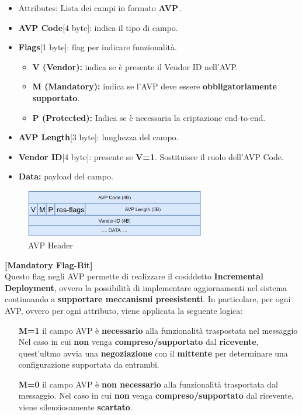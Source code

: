 \begin{itemize}
    \item Attributes: Lista dei campi in formato \textbf{AVP}\footnotemark\,.
\end{itemize}
\begin{definition}
\begin{itemize}
    \item \textbf{AVP Code}[4 byte]: indica il tipo di campo.
    \item \textbf{Flags}[1 byte]: flag per indicare funzionalità.
    \begin{itemize}
        \item \textbf{V (Vendor):} indica se è presente il Vendor ID nell'AVP.
        \item \textbf{M (Mandatory):} indica se l'AVP deve essere \textbf{obbligatoriamente supportato}.
        \item \textbf{P (Protected):} Indica se è necessaria la criptazione end-to-end.
    \end{itemize}
    \item \textbf{AVP Length}[3 byte]: lunghezza del campo.
    \item \textbf{Vendor ID}[4 byte]: presente se \textbf{V=1}. Sostituisce il ruolo dell'AVP Code.
    \item \textbf{Data:} payload del campo.
\end{itemize}
\end{definition}
\begin{figure}[ht]
    \centering
    \includegraphics[width=0.7\textwidth]{image/avpheader.png}
    \caption{AVP Header}
    \label{fig:avpheader}
\end{figure}\pagebreak
\begin{note}\textbf{[Mandatory Flag-Bit]}\\
Questo flag negli AVP permette di realizzare il cosiddetto \textbf{Incremental Deployment}, ovvero la possibilità di implementare aggiornamenti nel sistema continuando a \textbf{supportare meccanismi preesistenti}. In particolare, per ogni AVP, ovvero per ogni attributo, viene applicata la seguente logica:
\begin{itemize}
    \item [\textbf{M=1}] il campo AVP è \textbf{necessario} alla funzionalità traspostata nel messaggio Nel caso in cui \textbf{non} venga \textbf{compreso/supportato} dal \textbf{ricevente}, quest'ultmo avvia una \textbf{negoziazione} con il \textbf{mittente} per determinare una configurazione supportata da entrambi.
    \item [\textbf{M=0}] il campo AVP è \textbf{non necessario} alla funzionalità trasportata dal messaggio. Nel caso in cui \textbf{non} venga \textbf{compreso/supportato} dal ricevente, viene silenziosamente \textbf{scartato}.
\end{itemize}
\end{note}
